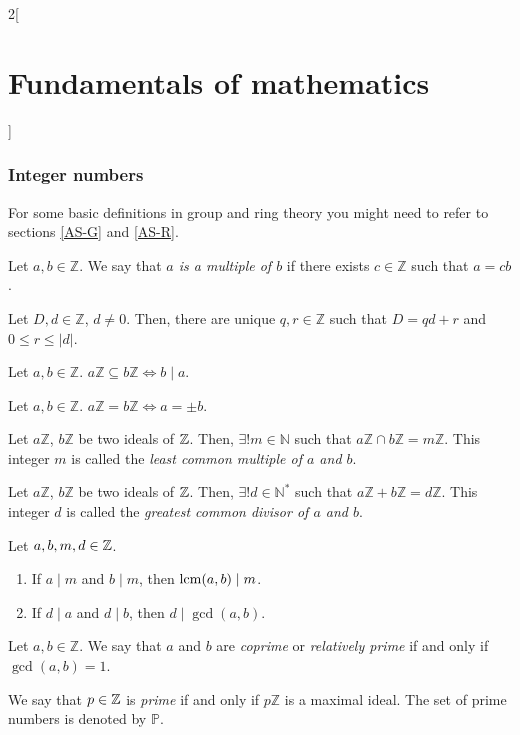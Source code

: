 \documentclass[../../../main.tex]{subfiles}
\begin{document}
\begin{multicols}{2}[\section{Fundamentals of mathematics}]
  \subsubsection{Integer numbers}
  For some basic definitions in group and ring theory you might need to refer to sections \ref{AS-G} and \ref{AS-R}.
  \begin{definition}
    Let $a,b\in\mathbb{Z}$. We say that \textit{$a$ is a multiple of $b$} if there exists $c\in\mathbb{Z}$ such that $a=cb$.
  \end{definition}
  \begin{theorem}
    Let $D,d\in\mathbb{Z}$, $d\ne 0$. Then, there are unique $q,r\in\mathbb{Z}$ such that $D=qd+r$ and $0\leq r\leq|d|$.
  \end{theorem}
  \begin{prop}
    Let $a,b\in \mathbb{Z}$. $a\mathbb{Z}\subseteq b\mathbb{Z}\iff b\mid a$.
  \end{prop}
  \begin{corollary}
    Let $a,b\in \mathbb{Z}$. $a\mathbb{Z}=b\mathbb{Z}\iff a=\pm b$.
  \end{corollary}
  \begin{prop}
    Let $a\mathbb{Z}$, $b\mathbb{Z}$ be two ideals of $\mathbb{Z}$. Then, $\exists!m\in\mathbb{N}$ such that $a\mathbb{Z}\cap b\mathbb{Z}=m\mathbb{Z}$. This integer $m$ is called the \textit{least common multiple of $a$ and $b$}.
  \end{prop}
  \begin{prop}
    Let $a\mathbb{Z}$, $b\mathbb{Z}$ be two ideals of $\mathbb{Z}$. Then, $\exists!d\in\mathbb{N}^*$ such that $a\mathbb{Z}+b\mathbb{Z}=d\mathbb{Z}$. This integer $d$ is called the \textit{greatest common divisor of $a$ and $b$}.
  \end{prop}
  \begin{prop}
    Let $a,b,m,d\in\mathbb{Z}$.
    \begin{enumerate}
      \item If $a\mid m$ and $b\mid m$, then $\operatorname{lcm}(a,b)\mid m$.
      \item If $d\mid a$ and $d\mid b$, then $d\mid\gcd(a,b)$.
    \end{enumerate}
  \end{prop}
  \begin{definition}
    Let $a,b\in\mathbb{Z}$. We say that $a$ and $b$ are \textit{coprime} or \textit{relatively prime} if and only if $\gcd(a,b)=1$.
  \end{definition}
  \begin{definition}
    We say that $p\in\mathbb{Z}$ is \textit{prime} if and only if $p\mathbb{Z}$ is a maximal ideal. The set of prime numbers is denoted by $\mathbb{P}$.

\end{definition}
\end{multicols}
\end{document}
